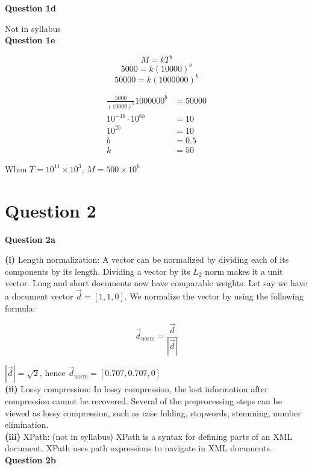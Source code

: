 \documentclass[11pt,a4paper]{report}
\begin{document}
\begin{multicols*}{2}
\noindent \textbf{Question 1d}

\noindent Not in syllabus\\

\noindent \textbf{Question 1e}

$$M=kT^b$$
$$5000=k(10000)^b$$
$$50000=k(1000000)^b$$

\begin{equation*}
\begin{split}
    \frac{5000}{(10000)^b}1000000^b &= 50000 \\
    10^{-4b}\cdot 10^{6b} &= 10 \\
    10^{2b} &= 10\\
    b &= 0.5\\
    k &= 50
\end{split}
\end{equation*}

\noindent When $T=10^{11} \times 10^3$, $M=500 \times 10^6$

\section{Question 2}

\noindent \textbf{Question 2a}

\noindent \textbf{(i)} Length normalization: A vector can be normalized by dividing each of its components by its length. Dividing a vector by its $L_2$ norm makes it a unit vector. Long and short documents now have comparable weights. Let say we have a document vector $\vec{d} = [1,1,0]$. We normalize the vector by using the following formula:

$$\vec{d}_{\text{norm}} = \frac{\vec{d}}{|\vec{d}|}$$

\noindent $|\vec{d}| = \sqrt{2}$, hence $\vec{d}_{\text{norm}} = [0.707, 0.707, 0]$ \\

\noindent \textbf{(ii)} Lossy compression: In lossy compression, the lost information after compression cannot be recovered. Several of the preprocessing steps can be viewed as lossy compression, such as case folding, stopwords, stemming, number elimination. \\

\noindent \textbf{(iii)} XPath: (not in syllabus) XPath is a syntax for defining parts of an XML document. XPath uses path expressions to navigate in XML documents. \\

\noindent \textbf{Question 2b}


\end{multicols*}
\end{document}
